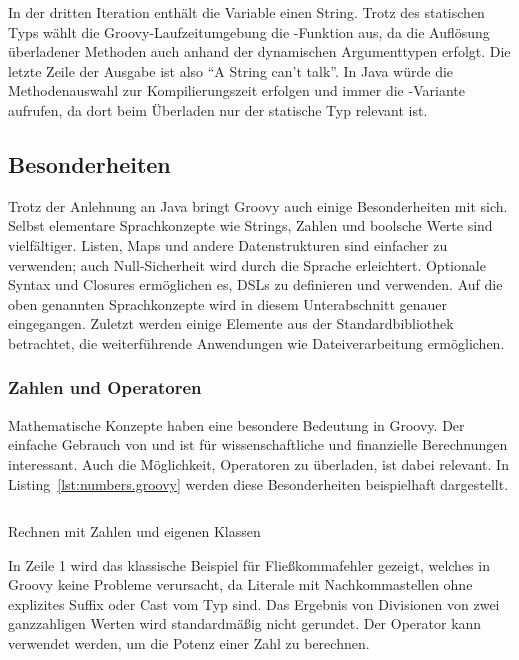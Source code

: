 \documentclass[a4paper]{article}
\newcommand{\outquote}[1]{``{#1}''}
\newcommand{\codelisting}[3]{\begin{listing}[htp]
	\inputminted{#1}{#1/#2}
	\vspace{-3ex}
	\caption{#3}
	\label{lst:#2}
\end{listing}}
\begin{document}
In der dritten Iteration enthält die Variable  einen String.
Trotz des statischen Typs  wählt die Groovy-Laufzeitumgebung die -Funktion aus, da die Auflösung überladener Methoden auch anhand der dynamischen Argumenttypen erfolgt.
Die letzte Zeile der Ausgabe ist also \outquote{A String can't talk}.
In Java würde die Methodenauswahl zur Kompilierungszeit erfolgen und immer die -Variante aufrufen, da dort beim Überladen nur der statische Typ relevant ist.

\subsection{Besonderheiten}\label{subsec:besonderheiten}

Trotz der Anlehnung an Java bringt Groovy auch einige Besonderheiten mit sich.
Selbst elementare Sprachkonzepte wie Strings, Zahlen und boolsche Werte sind vielfältiger.
Listen, Maps und andere Datenstrukturen sind einfacher zu verwenden; auch Null-Sicherheit wird durch die Sprache erleichtert.
Optionale Syntax und Closures ermöglichen es, DSLs zu definieren und verwenden.
Auf die oben genannten Sprachkonzepte wird in diesem Unterabschnitt genauer eingegangen.
Zuletzt werden einige Elemente aus der Standardbibliothek betrachtet, die weiterführende Anwendungen wie Dateiverarbeitung ermöglichen.

\subsubsection{Zahlen und Operatoren}\label{subsubsec:zahlen}

Mathematische Konzepte haben eine besondere Bedeutung in Groovy.
Der einfache Gebrauch von \break{} und  ist für wissenschaftliche und finanzielle Berechnungen interessant.
Auch die Möglichkeit, Operatoren zu überladen, ist dabei relevant.
In Listing~\ref{lst:numbers.groovy} werden diese Besonderheiten beispielhaft dargestellt.

\codelisting{groovy}{numbers.groovy}{Rechnen mit Zahlen und eigenen Klassen}

In Zeile 1 wird das klassische Beispiel für Fließkommafehler gezeigt, welches in Groovy keine Probleme verursacht, da Literale mit Nachkommastellen ohne explizites Suffix oder Cast vom Typ  sind.
Das Ergebnis von Divisionen von zwei ganzzahligen Werten wird standardmäßig nicht gerundet.
Der Operator \code{**} kann verwendet werden, um die Potenz einer Zahl zu berechnen.
\end{document}
